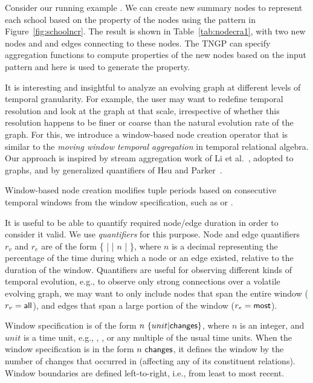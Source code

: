 \begin{example}
\vspace{-0.2cm}
Consider our running example \tg \ttt{}.  We can
create new summary nodes to represent each school based on the
 property of the nodes using the pattern in
Figure~\ref{fig:schoolncr}.  The result is shown in
Table~\ref{tab:nodecra1}, with two new nodes  and
 and  edges connecting to these nodes.
The TNGP can specify aggregation functions to compute properties of
the new nodes based on the input pattern and here  is
used to generate the  property.
\end{example}

It is interesting and insightful to analyze an evolving graph at
different levels of temporal granularity.  For example, the user may
want to redefine temporal resolution and look at the graph at that
scale, irrespective of whether this resolution happens to be finer or
coarse than the natural evolution rate of the graph.  For this, we
introduce a window-based node creation operator that is similar to the
{\em moving window temporal aggregation} in temporal relational
algebra.  Our approach is inspired by stream aggregation work of Li et
al.~\cite{Li2005}, adopted to graphs, and by generalized quantifiers
of Hsu and Parker~\cite{Hsu1995}.

Window-based node creation modifies tuple periods based on consecutive
temporal windows from the window specification, such as  or .

It is useful to be able to quantify required node/edge duration in
order to consider it valid.  We use {\em quantifiers} for this
purpose.  Node and edge quantifiers $r_v$ and $r_e$ are of the form \{
 |  |  $n$ |  \},
where $n$ is a decimal representing the percentage of the time during
which a node or an edge existed, relative to the duration of the
window.  Quantifiers are useful for observing different kinds of
temporal evolution, e.g., to observe only strong connections over a
volatile evolving graph, we may want to only include nodes that span
the entire window ($r_v=\textsf{all}$), and edges that span a large
portion of the window ($r_e=\textsf{most}$).

Window specification is of the form $n~\{unit|\textsf{changes}\}$,
where $n$ is an integer, and $unit$ is a time unit, e.g., , , or any multiple of the usual time units.
When the window specification is in the form $n~\textsf{changes}$, it
defines the window by the number of changes that occurred in \ttt
(affecting any of its constituent relations). Window boundaries are
defined left-to-right, i.e., from least to most recent.

